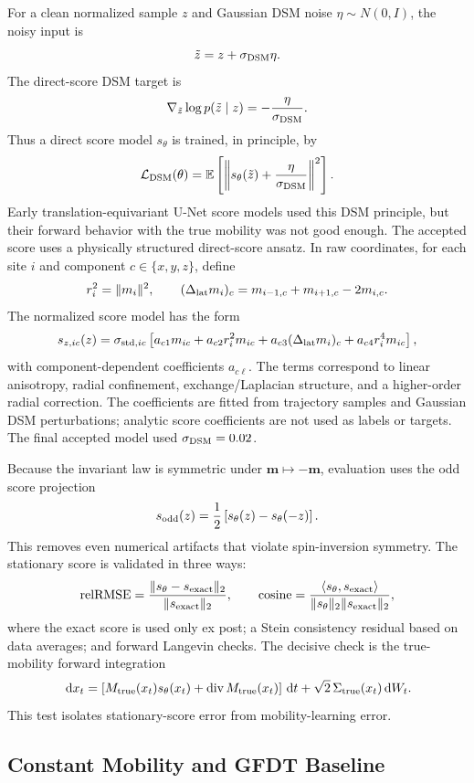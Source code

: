 \documentclass[11pt]{article}
\newcommand{\dd}{\,\mathrm{d}}
\newcommand{\E}{\mathbb{E}}
\begin{document}
For a clean normalized sample $z$ and Gaussian DSM noise
$\eta\sim N(0,I)$, the noisy input is
\[
  \tilde z=z+\sigma_{\rm DSM}\eta .
\]
The direct-score DSM target is
\[
  \nabla_{\tilde z}\log p(\tilde z\mid z)
  =
  -\frac{\eta}{\sigma_{\rm DSM}} .
\]
Thus a direct score model $s_\theta$ is trained, in principle, by
\[
  \mathcal L_{\rm DSM}(\theta)
  =
  \E\left[
    \left\|
      s_\theta(\tilde z)+\frac{\eta}{\sigma_{\rm DSM}}
    \right\|^2
  \right].
\]
Early translation-equivariant U-Net score models used this DSM principle, but
their forward behavior with the true mobility was not good enough.  The accepted
score uses a physically structured direct-score ansatz.  In raw coordinates,
for each site $i$ and component $c\in\{x,y,z\}$, define
\[
  r_i^2=\|m_i\|^2,\qquad
  (\Delta_{\rm lat}m_i)_c=m_{i-1,c}+m_{i+1,c}-2m_{i,c}.
\]
The normalized score model has the form
\[
  s_{z,ic}(z)
  =
  \sigma_{{\rm std},ic}
  \left[
    a_{c1}m_{ic}
    + a_{c2}r_i^2m_{ic}
    + a_{c3}(\Delta_{\rm lat}m_i)_c
    + a_{c4}r_i^4m_{ic}
  \right],
\]
with component-dependent coefficients $a_{c\ell}$.  The terms correspond to
linear anisotropy, radial confinement, exchange/Laplacian structure, and a
higher-order radial correction.  The coefficients are fitted from trajectory
samples and Gaussian DSM perturbations; analytic score coefficients are not used
as labels or targets.  The final accepted model used
$\sigma_{\rm DSM}=0.02$.

Because the invariant law is symmetric under $\bm m\mapsto-\bm m$, evaluation
uses the odd score projection
\[
  s_{\rm odd}(z)=\frac12\left[s_\theta(z)-s_\theta(-z)\right].
\]
This removes even numerical artifacts that violate spin-inversion symmetry.
The stationary score is validated in three ways:
\[
  {\rm relRMSE}
  =
  \frac{\|s_\theta-s_{\rm exact}\|_2}{\|s_{\rm exact}\|_2},
  \qquad
  {\rm cosine}
  =
  \frac{\langle s_\theta,s_{\rm exact}\rangle}
       {\|s_\theta\|_2\|s_{\rm exact}\|_2},
\]
where the exact score is used only ex post; a Stein consistency residual based
on data averages; and forward Langevin checks.  The decisive check is the
true-mobility forward integration
\[
  \dd x_t
  =
  \left[
    M_{\rm true}(x_t)s_\theta(x_t)
    +
    \operatorname{div}M_{\rm true}(x_t)
  \right]\dd t
  +
  \sqrt2\,\Sigma_{\rm true}(x_t)\dd W_t .
\]
This test isolates stationary-score error from mobility-learning error.

\subsection{Constant Mobility and GFDT Baseline}
\end{document}
